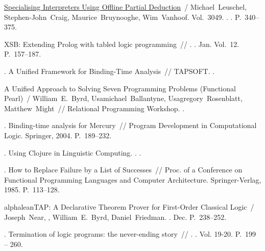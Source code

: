 \begin{thebibliography}{10}
  \href{http://dx.doi.org/10.1007/978-3-540-25951-0_11}{Specialising Interpreters
    Using Offline Partial Deduction}~/ Michael~Leuschel, Stephen-John~Craig,
    Maurice~Bruynooghe, Wim~Vanhoof. \BibDash
  \newblock Vol.~3049. \BibDash
  . . \BibDash
  \newblock P.~340--375.

   XSB: Extending Prolog with tabled
    logic programming~// .
    \BibDash
  . \BibDash Jan. \BibDash
  \newblock Vol.~12. \BibDash
  \newblock P.~157--187.

  . A Unified Framework for Binding-Time Analysis~//
    TAPSOFT. \BibDash
  .

  A Unified Approach to Solving Seven Programming Problems (Functional Pearl)~/
    William~E.~Byrd, Usamichael~Ballantyne, Usagregory~Rosenblatt,
    Matthew~Might~// Relational Programming Workshop. \BibDash
  .

  . Binding-time
    analysis for Mercury~// Program Development in Computational Logic. \BibDash
  \newblock Springer, 2004. \BibDash
  \newblock P.~189--232.

  . Using Clojure in
    Linguistic Computing. \BibDash
  . .

  . How to Replace Failure by a List of Successes~// Proc.
    of a Conference on Functional Programming Languages and Computer
    Architecture. \BibDash
  \newblock Springer-Verlag, 1985. \BibDash
  \newblock P.~113–128.

  alphaleanTAP: A Declarative Theorem Prover for First-Order Classical Logic~/
    Joseph~Near, , William~E.~Byrd, Daniel~Friedman. \BibDash
  . \BibDash Dec. \BibDash
  \newblock P.~238--252.

  . Termination of logic programs: the
    never-ending story~// . \BibDash
  . \BibDash
  \newblock Vol. 19-20. \BibDash
  \newblock P.~199 -- 260.


\end{thebibliography}
